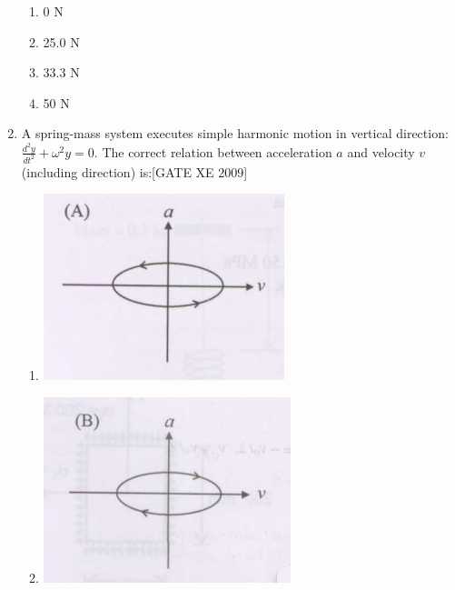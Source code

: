 \documentclass[journal,12pt,onecolumn]{IEEEtran}
\theoremstyle{remark}
\begin{document}
\begin{enumerate}
\begin{multicols}{2}
\begin{enumerate}
    \item 0 N
    \item 25.0 N
    \item 33.3 N
    \item 50 N
\end{enumerate}
\end{multicols}




\item A spring-mass system executes simple harmonic motion in vertical direction: $\frac{d^2 y}{dt^2} + \omega^2 y = 0$. The correct relation between acceleration $a$ and velocity $v$ (including direction) is:\hfill[GATE XE 2009]
\begin{multicols}{2}
\begin{enumerate} 
\item \includegraphics[width=0.4\columnwidth]{figs/fig20.png} 
\item \includegraphics[width=0.4\columnwidth]{figs/fig21.png}
      

\end{enumerate}
\end{multicols}
\end{enumerate}
\end{document}
